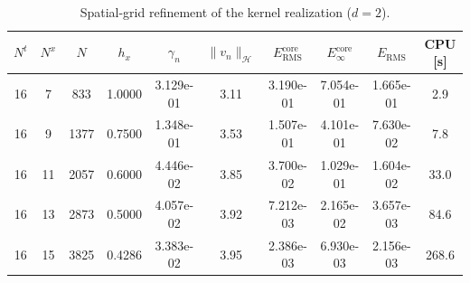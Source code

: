 \begin{table}[tb]
  \centering
  \small
  \caption{Spatial-grid refinement of the kernel realization ($d=2$).}
  \label{tab:ker.refine_d2}
  \begin{tabular}{cccccccccc}
    \toprule
    $N^t$ & $N^x$ & $N$ & $h_x$ & $\gamma_n$ & $\|v_n\|_{\mathcal H}$ & $E_{\mathrm{RMS}}^{\mathrm{core}}$ & $E_{\infty}^{\mathrm{core}}$ & $E_{\mathrm{RMS}}$ & CPU [s] \\
    \midrule
    16 & 7 & 833 & 1.0000 & 3.129e-01 & 3.11 & 3.190e-01 & 7.054e-01 & 1.665e-01 & 2.9 \\
    16 & 9 & 1377 & 0.7500 & 1.348e-01 & 3.53 & 1.507e-01 & 4.101e-01 & 7.630e-02 & 7.8 \\
    16 & 11 & 2057 & 0.6000 & 4.446e-02 & 3.85 & 3.700e-02 & 1.029e-01 & 1.604e-02 & 33.0 \\
    16 & 13 & 2873 & 0.5000 & 4.057e-02 & 3.92 & 7.212e-03 & 2.165e-02 & 3.657e-03 & 84.6 \\
    16 & 15 & 3825 & 0.4286 & 3.383e-02 & 3.95 & 2.386e-03 & 6.930e-03 & 2.156e-03 & 268.6 \\
    \bottomrule
  \end{tabular}
\end{table}
